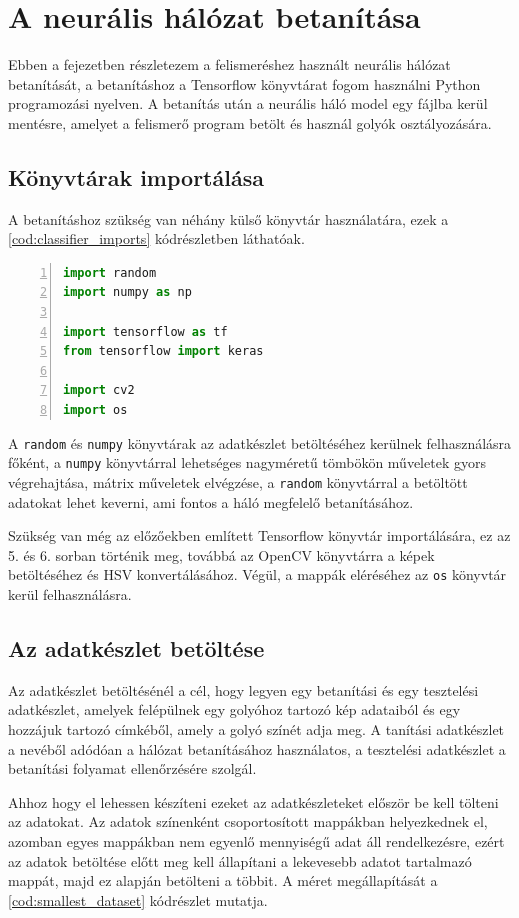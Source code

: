 \chapter{A neurális hálózat betanítása}
Ebben a fejezetben részletezem a felismeréshez használt neurális hálózat betanítását, a betanításhoz a Tensorflow\cite{tensorflow_autodiff} könyvtárat fogom használni Python programozási nyelven. A betanítás után a neurális háló model egy fájlba kerül mentésre, amelyet a felismerő program betölt és használ golyók osztályozására.

\section{Könyvtárak importálása}
A betanításhoz szükség van néhány külső könyvtár használatára, ezek a \ref{cod:classifier_imports} kódrészletben láthatóak.

\begin{codewrapper}
\begin{lstlisting}[language=Python, numbers=left, caption={A betanításhoz használt könyvtárak importálása.}, label={cod:classifier_imports}]
import random
import numpy as np

import tensorflow as tf
from tensorflow import keras

import cv2
import os
\end{lstlisting}
\end{codewrapper}

\par A \lstinline{random} és \lstinline{numpy} könyvtárak az adatkészlet betöltéséhez kerülnek felhasználásra főként, a \lstinline{numpy} könyvtárral lehetséges nagyméretű tömbökön műveletek gyors végrehajtása, mátrix műveletek elvégzése, a \lstinline{random} könyvtárral a betöltött adatokat lehet keverni, ami fontos a háló megfelelő betanításához.
\par Szükség van még az előzőekben említett Tensorflow könyvtár importálására, ez az 5. és 6. sorban történik meg, továbbá az OpenCV könyvtárra a képek betöltéséhez és HSV konvertálásához. Végül, a mappák eléréséhez az \lstinline{os} könyvtár kerül felhasználásra.

\section{Az adatkészlet betöltése}
Az adatkészlet betöltésénél a cél, hogy legyen egy betanítási és egy tesztelési adatkészlet, amelyek felépülnek egy golyóhoz tartozó kép adataiból és egy hozzájuk tartozó címkéből, amely a golyó színét adja meg. A tanítási adatkészlet a nevéből adódóan a hálózat betanításához használatos, a tesztelési adatkészlet a betanítási folyamat ellenőrzésére szolgál.
\par Ahhoz hogy el lehessen készíteni ezeket az adatkészleteket először be kell tölteni az adatokat. Az adatok színenként csoportosított mappákban helyezkednek el, azomban egyes mappákban nem egyenlő mennyiségű adat áll rendelkezésre, ezért az adatok betöltése előtt meg kell állapítani a lekevesebb adatot tartalmazó mappát, majd ez alapján betölteni a többit. A méret megállapítását a \ref{cod:smallest_dataset} kódrészlet mutatja.

